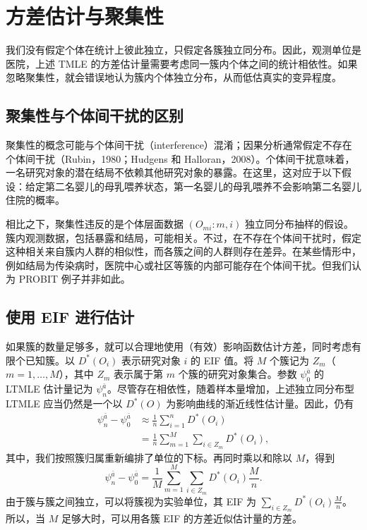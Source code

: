 \section{方差估计与聚集性}

我们没有假定个体在统计上彼此独立，只假定各簇独立同分布。因此，观测单位是医院，上述 TMLE 的方差估计量需要考虑同一簇内个体之间的统计相依性。如果忽略聚集性，就会错误地认为簇内个体独立分布，从而低估真实的变异程度。

\subsection{聚集性与个体间干扰的区别}

聚集性的概念可能与个体间干扰（interference）混淆；因果分析通常假定不存在个体间干扰（Rubin，1980；Hudgens 和 Halloran，2008）。个体间干扰意味着，一名研究对象的潜在结局不依赖其他研究对象的暴露。在这里，这对应于以下假设：给定第二名婴儿的母乳喂养状态，第一名婴儿的母乳喂养不会影响第二名婴儿住院的概率。

相比之下，聚集性违反的是个体层面数据 $(O_{mi}:m,i)$ 独立同分布抽样的假设。簇内观测数据，包括暴露和结局，可能相关。不过，在不存在个体间干扰时，假定这种相关来自簇内人群的相似性，而各簇之间的人群则存在差异。在某些情形中，例如结局为传染病时，医院中心或社区等簇的内部可能存在个体间干扰。但我们认为 PROBIT 例子并非如此。

\subsection{使用 EIF 进行估计}

如果簇的数量足够多，就可以合理地使用（有效）影响函数估计方差，同时考虑有限个已知簇。以 $D^*(O_i)$ 表示研究对象 $i$ 的 EIF 值。将 $M$ 个簇记为 $Z_m$（$m=1,\ldots,M$），其中 $Z_m$ 表示属于第 $m$ 个簇的研究对象集合。参数 $\psi_0^{\bar a}$ 的 LTMLE 估计量记为 $\psi_n^{\bar a}$。尽管存在相依性，随着样本量增加，上述独立同分布型 LTMLE 应当仍然是一个以 $D^*(O)$ 为影响曲线的渐近线性估计量。因此，仍有
\[
\begin{aligned}
 \psi_n^{\bar a}-\psi_0^{\bar a}
 &\approx\frac{1}{n}\sum_{i=1}^{n}D^*(O_i)\\
 &=\frac{1}{n}\sum_{m=1}^{M}\sum_{i\in Z_m}D^*(O_i),
\end{aligned}
\]
其中，我们按照簇归属重新编排了单位的下标。再同时乘以和除以 $M$，得到
\[
 \psi_n^{\bar a}-\psi_0^{\bar a}
 =\frac{1}{M}\sum_{m=1}^{M}\sum_{i\in Z_m}D^*(O_i)\frac{M}{n}.
\]
由于簇与簇之间独立，可以将簇视为实验单位，其 EIF 为
$\sum_{i\in Z_m}D^*(O_i)\frac{M}{n}$。
所以，当 $M$ 足够大时，可以用各簇 EIF 的方差近似估计量的方差。

